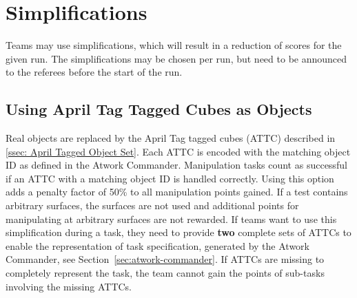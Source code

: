 \section{Simplifications}
Teams may use simplifications, which will result in a reduction of scores for the given run. The simplifications may be chosen per run, but need to be announced to the referees before the start of the run.


\subsection{Using April Tag Tagged Cubes as Objects}%
\label{ssec:simplification_ato}
Real objects are replaced by the April Tag tagged cubes (ATTC)  described in \ref{ssec: April Tagged Object Set}.
Each ATTC is encoded with the matching object ID as defined in the Atwork Commander.
Manipulation tasks count as successful if an ATTC with a matching object ID is handled correctly. Using this option adds
a penalty factor of 50\% to all manipulation points gained. If a test contains arbitrary surfaces, the surfaces are not
used and additional points for manipulating at arbitrary surfaces are not rewarded. If teams want to use this
simplification during a task, they need to  provide \textbf{two} complete sets of ATTCs to enable the representation of
task specification, generated by the Atwork Commander, see Section~\ref{sec:atwork-commander}. If ATTCs are missing to
completely represent the task, the team cannot gain the points of sub-tasks involving the missing ATTCs.




